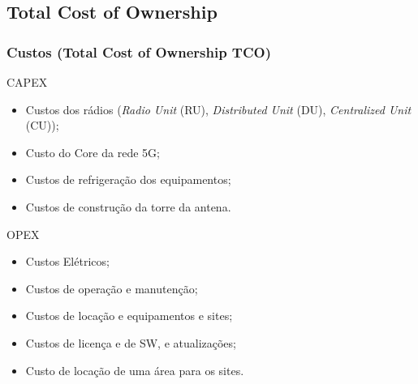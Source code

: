 \documentclass[t]{beamer}
\begin{document}
\subsection{Total Cost of Ownership}
\begin{frame}
	\frametitle{Custos (Total Cost of Ownership TCO)}
	\footnotesize
	CAPEX
	\begin{itemize}
		\item Custos dos rádios (\textit{Radio Unit }(RU), \textit{Distributed Unit }(DU), \textit{Centralized Unit }(CU));
		\item Custo do Core da rede 5G;
		\item Custos de refrigeração dos equipamentos;
		\item Custos de construção da torre da antena.
	\end{itemize}
	OPEX
	\begin{itemize}
		\item Custos Elétricos;
		\item Custos de operação e manutenção;
		\item Custos de locação e equipamentos e sites;
		\item Custos de licença e de SW, e atualizações;
		\item Custo de locação de uma área para os sites.
	\end{itemize}
\end{frame}
\end{document}
